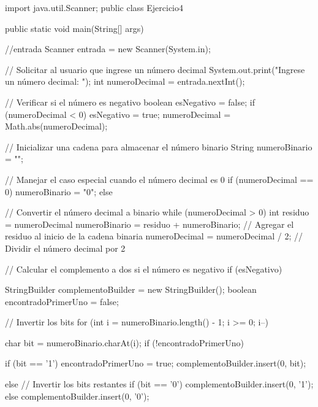 \lstset{
  language=Java,
  basicstyle=\ttfamily,
  keywordstyle=\bfseries,
  commentstyle=\itshape,
  showstringspaces=false,
  columns=flexible,
  frame=single,
  numbers=left,
  numberstyle=\tiny,
  breaklines=true,
  captionpos=b
}

\begin{javaCode}


import java.util.Scanner;
public class Ejercicio4 {

  
    public static void main(String[] args) {
        //entrada
             Scanner entrada = new Scanner(System.in);

        // Solicitar al usuario que ingrese un número decimal
        System.out.print("Ingrese un número decimal: ");
        int numeroDecimal = entrada.nextInt();

        // Verificar si el número es negativo
        boolean esNegativo = false;
        if (numeroDecimal < 0) {
            esNegativo = true;
            numeroDecimal = Math.abs(numeroDecimal);
        }

        // Inicializar una cadena para almacenar el número binario
        String numeroBinario = "";

        // Manejar el caso especial cuando el número decimal es 0
        if (numeroDecimal == 0) {
            numeroBinario = "0";
        } else {
            // Convertir el número decimal a binario
            while (numeroDecimal > 0) {
                int residuo = numeroDecimal %
                numeroBinario = residuo + numeroBinario; // Agregar el residuo al inicio de la cadena binaria
                numeroDecimal = numeroDecimal / 2; // Dividir el número decimal por 2
            }

            // Calcular el complemento a dos si el número es negativo
            if (esNegativo) {
                StringBuilder complementoBuilder = new StringBuilder();
                boolean encontradoPrimerUno = false;

                // Invertir los bits
                for (int i = numeroBinario.length() - 1; i >= 0; i--) {
                    char bit = numeroBinario.charAt(i);
                    if (!encontradoPrimerUno) {
                 
                        if (bit == '1') {
                            encontradoPrimerUno = true;
                        }
                        complementoBuilder.insert(0, bit);
                    } else {
                        // Invertir los bits restantes
                        if (bit == '0') {
                            complementoBuilder.insert(0, '1');
                        } else {
                            complementoBuilder.insert(0, '0');
                        }
                    }
                }

}}}}
\end{javaCode}
